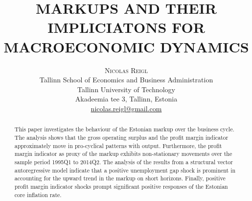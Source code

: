 \documentclass[twoside]{article}
\title{\vspace{-15mm}\fontsize{18pt}{12pt}\selectfont\textbf{MARKUPS AND THEIR IMPLICIATONS FOR MACROECONOMIC DYNAMICS}} %
\author{
\large
\textsc{Nicolas Reigl} \\ %
\normalsize Tallinn School of Economics and Business Administration 
\normalsize \\ Tallinn University of Technology
\normalsize \\ Akadeemia tee 3, Tallinn, Estonia \\ %
\normalsize \href{mailto:nicolas.reigl@gmail.com}{nicolas.reigl@gmail.com} %
\vspace{-5mm}
}
\date{}
\begin{document}
\maketitle %

\thispagestyle{fancy} %


\begin{abstract}

\noindent This paper investigates the behaviour of the Estonian markup over the business cycle. The analysis shows that the gross operating surplus and the profit margin indicator approximately move in pro-cyclical patterns with output. Furthermore, the profit margin indicator as proxy of the markup exhibits non-stationary movements over the sample period 1995Q1 to 2014Q2. The analysis of the results from a structural vector autoregressive model indicate that a positive unemployment gap shock is prominent in accounting for the upward trend in the markup on short horizons. Finally, positive profit margin indicator shocks prompt significant positive responses of the Estonian core inflation rate.     %

\end{abstract}

\end{document}
